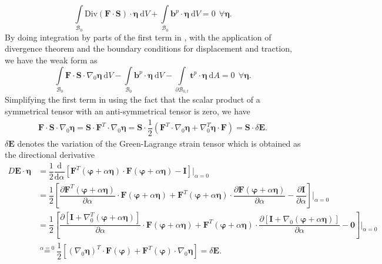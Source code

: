 \begin{equation}
\int\limits_{\mathcal{B}_0} \text{Div}(\mathbf{F} \cdot \mathbf{S}) \cdot \bm{\eta} \ \mathrm{d}V + \int\limits_{\mathcal{B}_0} \mathbf{b}^p \cdot \bm{\eta} \ \mathrm{d}V = 0 \ \ \forall \bm{\eta}.
\label{eq:2.7}
\end{equation}
By doing integration by parts of the first term in , with the application of divergence theorem and the boundary conditions for displacement and traction, we have the weak form as 
\begin{equation}
\int\limits_{\mathcal{B}_0} \mathbf{F} \cdot \mathbf{S} \cdot \nabla_0 \bm{\eta} \ \mathrm{d}V - \int\limits_{\mathcal{B}_0} \mathbf{b}^p \cdot \bm{\eta} \ \mathrm{d}V - \int\limits_{\mathcal{\partial B}_{0,t}} \mathbf{t}^p \cdot \bm{\eta} \ \mathrm{d}A = 0 \ \ \forall \bm{\eta}.
\label{eq:2.8}
\end{equation}
Simplifying the first term in  using the fact that the scalar product of a symmetrical tensor with an anti-symmetrical tensor is zero, we have
\begin{align}
\mathbf{F} \cdot \mathbf{S} \cdot \nabla_0 \bm{\eta} = \mathbf{S} \cdot \mathbf{F}^T \cdot \nabla_0 \bm{\eta} = \mathbf{S} \cdot \dfrac{1}{2} (\mathbf{F}^T \cdot \nabla_0 \bm{\eta} + \nabla_0^T \bm{\eta} \cdot \mathbf{F}) = \mathbf{S} \cdot \delta \mathbf{E}.
\label{eq:2.9}
\end{align}
$\delta \mathbf{E}$ denotes the variation of the Green-Lagrange strain tensor which is obtained as the directional derivative
\begin{align}
D\mathbf{E} \cdot \bm{\eta} &= \dfrac{1}{2} \dfrac{\mathrm{d}}{\mathrm{d}\alpha} \left[ \mathbf{F}^T (\bm{\varphi} + \alpha \bm{\eta}) \cdot \mathbf{F}(\bm{\varphi} + \alpha \bm{\eta}) - \mathbf{I} \right] \Big|_{\alpha = 0} \nonumber \\
&= \dfrac{1}{2} \left[ \dfrac{\partial \mathbf{F}^T (\bm{\varphi} + \alpha \bm{\eta})}{\partial \alpha} \cdot \mathbf{F}(\bm{\varphi} + \alpha \bm{\eta}) + \mathbf{F}^T (\bm{\varphi} + \alpha \bm{\eta}) \cdot \dfrac{\partial \mathbf{F}(\bm{\varphi} + \alpha \bm{\eta})}{\partial \alpha} - \dfrac{\partial \mathbf{I}}{\partial \alpha} \right] \Bigg|_{\alpha = 0} \nonumber \\
&= \dfrac{1}{2} \left[ \dfrac{\partial \left[ \mathbf{I} + \nabla_0^T (\bm{\varphi} + \alpha \bm{\eta}) \right]}{\partial \alpha} \cdot \mathbf{F}(\bm{\varphi} + \alpha \bm{\eta}) + \mathbf{F}^T (\bm{\varphi} + \alpha \bm{\eta}) \cdot \dfrac{\partial \left[ \mathbf{I} + \nabla_0 (\bm{\varphi} + \alpha \bm{\eta}) \right]}{\partial \alpha} - \mathbf{0} \right] \Bigg|_{\alpha = 0} \nonumber \\
&\stackrel{\alpha = 0}{=} \dfrac{1}{2} \left[ (\nabla_0 \bm{\eta})^T \cdot \mathbf{F} (\bm{\varphi}) + \mathbf{F}^T (\bm{\varphi}) \cdot \nabla_0 \bm{\eta} \right] = \delta \mathbf{E}.
\label{eq:2.10}
\end{align}
